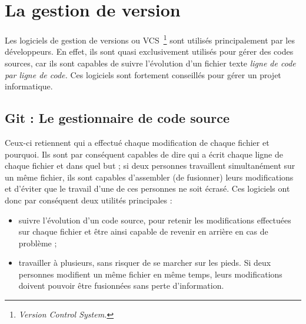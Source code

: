 \chapter{La gestion de version} %
\label{cha:La gestion de version}

\begin{it}
Les logiciels de gestion de versions ou VCS\, \footnote{\emph{Version
Control System.}} sont utilisés principalement par les développeurs. En
effet, ils sont quasi exclusivement utilisés pour gérer des codes
sources, car ils sont capables de suivre l’évolution d’un fichier texte
\emph{ligne de code par ligne de code.} Ces logiciels sont fortement
conseillés pour gérer un projet informatique.
\end{it}

\section{Git : Le gestionnaire de code source} %
\label{sec:Git : Le gestionnaire de code source}

Ceux-ci retiennent qui a effectué chaque modification de chaque fichier
et pourquoi. Ils sont par conséquent capables de dire qui a écrit chaque
ligne de chaque fichier et dans quel but ; si deux personnes travaillent
simultanément sur un même fichier, ils sont capables d’assembler (de
fusionner) leurs modifications et d’éviter que le travail d’une de ces
personnes ne soit écrasé. Ces logiciels ont donc par conséquent deux
utilités principales :

\begin{itemize}

  \item suivre l’évolution d’un code source, pour retenir les
    modifications effectuées sur chaque fichier et être ainsi capable de
    revenir en arrière en cas de problème ;

  \item travailler à plusieurs, sans risquer de se marcher sur les
    pieds.  Si deux personnes modifient un même fichier en même temps,
    leurs modifications doivent pouvoir être fusionnées sans perte
    d’information.

\end{itemize}

